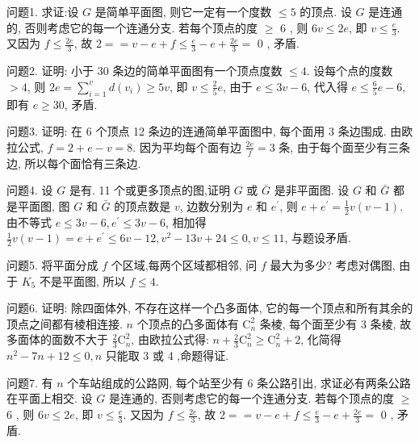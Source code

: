 
问题1. 求证:设 $G$ 是简单平面图, 则它一定有一个度数 $\leqslant 5$ 的顶点.
设 $G$ 是连通的, 否则考虑它的每一个连通分支.
若每个顶点的度 $\geqslant$ 6 , 则 $6 v \leqslant 2 e$, 即 $v \leqslant \frac{e}{3}$. 又因为 $f \leqslant \frac{2 e}{3}$, 故 $2==v-e+f \leqslant \frac{e}{3}-e+\frac{2 e}{3}=$ 0 , 矛盾.



问题2. 证明: 小于 30 条边的简单平面图有一个顶点度数 $\leqslant 4$.
设每个点的度数 $>4$, 则 $2 e=\sum_{i=1}^v d\left(v_i\right) \geqslant 5 v$, 即 $v \leqslant \frac{2}{5} e$, 由于 $e \leqslant 3 v-6$, 代入得 $e \leqslant \frac{6}{5} e-6$, 即有 $e \geqslant 30$, 矛盾.



问题3. 证明: 在 6 个顶点 12 条边的连通简单平面图中, 每个面用 3 条边围成.
由欧拉公式, $f=2+e-v=8$. 因为平均每个面有边 $\frac{2 e}{f}=3$ 条, 由于每个面至少有三条边, 所以每个面恰有三条边.



问题4. 设 $G$ 是有.
11 个或更多顶点的图,证明 $G$ 或 $\bar{G}$ 是非平面图.
设 $G$ 和 $\bar{G}$ 都是平面图, 图 $G$ 和 $\bar{G}$ 的顶点数是 $v$, 边数分别为 $e$ 和 $e^{\prime}$, 则 $e+e^{\prime}=\frac{1}{2} v(v-1)$. 由不等式 $e \leqslant 3 v-6, e^{\prime} \leqslant 3 v-6$, 相加得 $\frac{1}{2} v(v-1)= e+e^{\prime} \leqslant 6 v-12, v^2-13 v+24 \leqslant 0, v \leqslant 11$, 与题设矛盾.



问题5. 将平面分成 $f$ 个区域,每两个区域都相邻, 问 $f$ 最大为多少?
考虑对偶图, 由于 $K_5$ 不是平面图, 所以 $f \leqslant 4$.



问题6. 证明: 除四面体外, 不存在这样一个凸多面体, 它的每一个顶点和所有其余的顶点之间都有棱相连接.
$n$ 个顶点的凸多面体有 $\mathrm{C}_n^2$ 条棱, 每个面至少有 3 条棱, 故多面体的面数不大于 $\frac{2}{3} \mathrm{C}_n^2$, 由欧拉公式得: $n+\frac{2}{3} \mathrm{C}_n^2 \geqslant \mathrm{C}_n^2+2$, 化简得 $n^2-7 n+12 \leqslant 0, n$ 只能取 3 或 4 ,命题得证.



问题7. 有 $n$ 个车站组成的公路网, 每个站至少有 6 条公路引出, 求证必有两条公路在平面上相交.
设 $G$ 是连通的, 否则考虑它的每一个连通分支.
若每个顶点的度 $\geqslant$ 6 , 则 $6 v \leqslant 2 e$, 即 $v \leqslant \frac{e}{3}$. 又因为 $f \leqslant \frac{2 e}{3}$, 故 $2==v-e+f \leqslant \frac{e}{3}-e+\frac{2 e}{3}=$ 0 , 矛盾.



